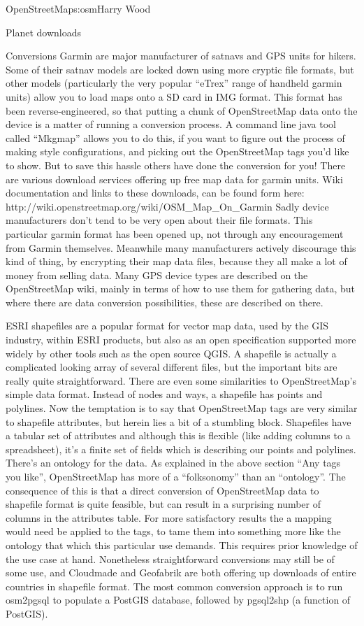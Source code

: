 \begin{aosachapter}{OpenStreetMap}{s:osm}{Harry Wood}
\begin{aosasect1}{Planet downloads}
\begin{aosasect2}{Conversions}
Garmin are major manufacturer of satnavs and GPS units for
hikers. Some of their satnav models are locked down using more cryptic
file formats, but other models (particularly the very popular
``eTrex'' range of handheld garmin units) allow you to load maps onto
a SD card in IMG format. This format has been reverse-engineered, so
that putting a chunk of OpenStreetMap data onto the device is a matter
of running a conversion process. A command line java tool called
``Mkgmap'' allows you to do this, if you want to figure out the
process of making style configurations, and picking out the
OpenStreetMap tags you'd like to show. But to save this hassle others
have done the conversion for you! There are various download services
offering up free map data for garmin units. Wiki documentation and
links to these downloads, can be found form here:
http://wiki.openstreetmap.org/wiki/OSM\_Map\_On\_Garmin Sadly device
manufacturers don't tend to be very open about their file
formats. This particular garmin format has been opened up, not through
any encouragement from Garmin themselves. Meanwhile many manufacturers
actively discourage this kind of thing, by encrypting their map data
files, because they all make a lot of money from selling data. Many
GPS device types are described on the OpenStreetMap wiki, mainly in
terms of how to use them for gathering data, but where there are data
conversion possibilities, these are described on there.

ESRI shapefiles are a popular format for vector map data, used by the
GIS industry, within ESRI products, but also as an open specification
supported more widely by other tools such as the open source QGIS. A
shapefile is actually a complicated looking array of several different
files, but the important bits are really quite straightforward. There
are even some similarities to OpenStreetMap's simple data
format. Instead of nodes and ways, a shapefile has points and
polylines. Now the temptation is to say that OpenStreetMap tags are
very similar to shapefile attributes, but herein lies a bit of a
stumbling block. Shapefiles have a tabular set of attributes and
although this is flexible (like adding columns to a spreadsheet), it's
a finite set of fields which is describing our points and
polylines. There's an ontology for the data. As explained in the above
section ``Any tags you like'', OpenStreetMap has more of a
``folksonomy'' than an ``ontology''. The consequence of this is that a
direct conversion of OpenStreetMap data to shapefile format is quite
feasible, but can result in a surprising number of columns in the
attributes table. For more satisfactory results the a mapping would
need be applied to the tags, to tame them into something more like the
ontology that which this particular use demands. This requires prior
knowledge of the use case at hand. Nonetheless straightforward
conversions may still be of some use, and Cloudmade and Geofabrik are
both offering up downloads of entire countries in shapefile
format. The most common conversion approach is to run osm2pgsql to
populate a PostGIS database, followed by pgsql2shp (a function of
PostGIS).


\end{aosasect2}
\end{aosasect1}
\end{aosachapter}

